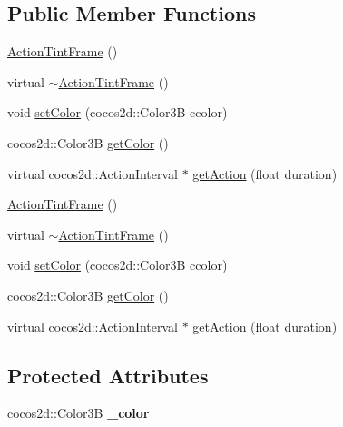 \subsection*{Public Member Functions}
\begin{DoxyCompactItemize}
\item 
\hyperlink{classcocostudio_1_1ActionTintFrame_aa7db0ef844b41d6819b4c3dba36db412}{Action\+Tint\+Frame} ()
\item 
virtual \hyperlink{classcocostudio_1_1ActionTintFrame_a185819ad8a59cb6ebf32ce8d53ff66d8}{$\sim$\+Action\+Tint\+Frame} ()
\item 
void \hyperlink{classcocostudio_1_1ActionTintFrame_abfa2d7b7047c5c6c7ca02a6c31c5fad4}{set\+Color} (cocos2d\+::\+Color3B ccolor)
\item 
cocos2d\+::\+Color3B \hyperlink{classcocostudio_1_1ActionTintFrame_a59a626f5811e60cbe788d6c7b028a870}{get\+Color} ()
\item 
virtual cocos2d\+::\+Action\+Interval $\ast$ \hyperlink{classcocostudio_1_1ActionTintFrame_ad1329f3513d3c40369182872a08d543e}{get\+Action} (float duration)
\item 
\hyperlink{classcocostudio_1_1ActionTintFrame_aa7db0ef844b41d6819b4c3dba36db412}{Action\+Tint\+Frame} ()
\item 
virtual \hyperlink{classcocostudio_1_1ActionTintFrame_af5346eee13f5b53f82209671ba4c6eb8}{$\sim$\+Action\+Tint\+Frame} ()
\item 
void \hyperlink{classcocostudio_1_1ActionTintFrame_abfa2d7b7047c5c6c7ca02a6c31c5fad4}{set\+Color} (cocos2d\+::\+Color3B ccolor)
\item 
cocos2d\+::\+Color3B \hyperlink{classcocostudio_1_1ActionTintFrame_a308347e4f4f4238062c9b925bd7f691b}{get\+Color} ()
\item 
virtual cocos2d\+::\+Action\+Interval $\ast$ \hyperlink{classcocostudio_1_1ActionTintFrame_a819d36221cd38cabd0a7936871578752}{get\+Action} (float duration)
\end{DoxyCompactItemize}
\subsection*{Protected Attributes}
\begin{DoxyCompactItemize}
\item 
\mbox{\label{classcocostudio_1_1ActionTintFrame_a9bdbccd8e40fd85c5e12ad6327d8c240}} 
cocos2d\+::\+Color3B {\bfseries \+\_\+color}
\end{DoxyCompactItemize}
